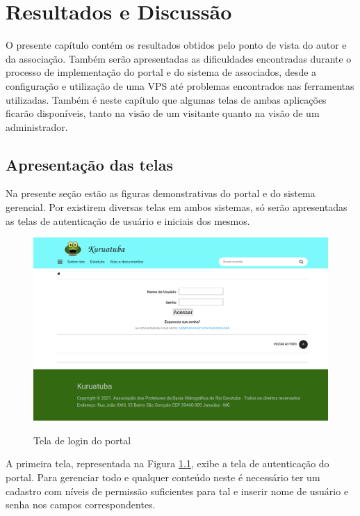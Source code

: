 \chapter{Resultados e Discussão}

O presente capítulo contém os resultados obtidos pelo ponto de vista do autor e da associação. Também serão apresentadas as dificuldades encontradas durante o processo de implementação do portal e do sistema de associados, desde a configuração e utilização de uma VPS até problemas encontrados nas ferramentas utilizadas. Também é neste capítulo que algumas telas de ambas aplicações ficarão disponíveis, tanto na visão de um visitante quanto na visão de um administrador.

\hspace{2.5cm}
\section{Apresentação das telas}
\label{subsec:telas}
\hspace{2.5cm}

Na presente seção estão as figuras demonstrativas do portal e do sistema gerencial. Por existirem diversas telas em ambos sistemas, só serão apresentadas as telas de autenticação de usuário e iniciais dos mesmos.

\begin{figure}[htb]
 \centering
 \caption{Tela de login do portal}
 \includegraphics[width=1\textwidth]{figuras/kuruatuba_portal_login.png}
 \label{fig:login-portal}
\end{figure}

A primeira tela, representada na Figura \ref{fig:login-portal}, exibe a tela de autenticação do portal. Para gerenciar todo e qualquer conteúdo neste é necessário ter um cadastro com níveis de permissão suficientes para tal e inserir nome de usuário e senha nos campos correspondentes.

